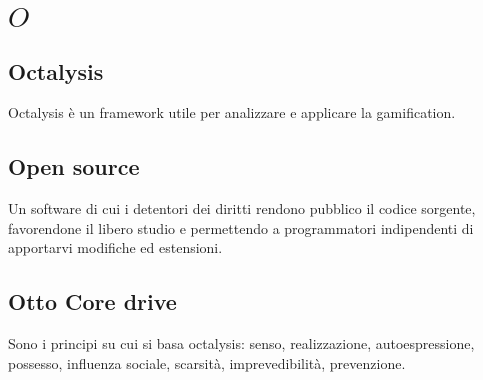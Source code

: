\section{\quad$O\quad$}
\subsection{Octalysis}
Octalysis è un framework utile per analizzare e applicare la gamification.

\subsection{Open source}
Un software di cui i detentori dei diritti rendono pubblico il codice sorgente, favorendone il libero studio e permettendo a programmatori indipendenti di apportarvi modifiche ed estensioni.

\subsection{Otto Core drive}
Sono i principi su cui si basa octalysis: senso, realizzazione, autoespressione, possesso, influenza sociale, scarsità, imprevedibilità, prevenzione.

